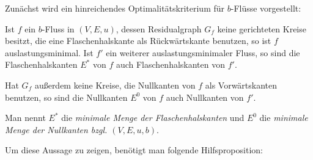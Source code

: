 Zunächst wird ein hinreichendes Optimalitätskriterium für $b$-Flüsse vorgestellt:

\begin{lemma}\label{lemma-min-flow-criterion}
	Ist $f$ ein $b$-Fluss in $(V, E, u)$, dessen Residualgraph $G_f$ keine gerichteten Kreise besitzt, die eine Flaschenhalskante als Rückwärtskante benutzen, so ist $f$ auslastungsminimal.
	Ist $f'$ ein weiterer auslastungsminimaler Fluss, so sind die Flaschenhalskanten $E^*$ von $f$ auch Flaschenhalskanten von $f'$.
	
	Hat $G_f$ außerdem keine Kreise, die Nullkanten von $f$ als Vorwärtskanten benutzen, so sind die Nullkanten $E^0$ von $f$ auch Nullkanten von $f'$.

	Man nennt $E^*$ die \emph{minimale Menge der Flaschenhalskanten} und $E^0$ die \emph{minimale Menge der Nullkanten bzgl. $(V, E, u, b)$}.
\end{lemma}

Um diese Aussage zu zeigen, benötigt man folgende Hilfsproposition:

